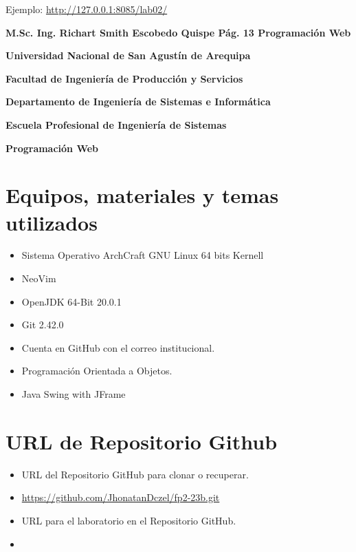Ejemplo: \url{http://127.0.0.1:8085/lab02/}

\textbf{M.Sc. Ing. Richart Smith Escobedo Quispe Pág. 13 Programación Web}

\textbf{Universidad Nacional de San Agustín de Arequipa}

\textbf{Facultad de Ingeniería de Producción y Servicios}

\textbf{Departamento de Ingeniería de Sistemas e Informática}

\textbf{Escuela Profesional de Ingeniería de Sistemas}

\textbf{Programación Web}
		
	\section{Equipos, materiales y temas utilizados}
	\begin{itemize}
		\item Sistema Operativo ArchCraft GNU Linux 64 bits Kernell
		\item NeoVim
		\item OpenJDK 64-Bit 20.0.1 
		\item Git 2.42.0
		\item Cuenta en GitHub con el correo institucional.
		\item Programación Orientada a Objetos.
    \item Java Swing with JFrame
	\end{itemize}
	\section{URL de Repositorio Github}
	\begin{itemize}
            \item URL del Repositorio GitHub para clonar o recuperar.
            \item \url{https://github.com/JhonatanDczel/fp2-23b.git}
            \item URL para el laboratorio \itemPracticeNumber{} en el Repositorio GitHub.
            \item \itemUrl
	\end{itemize}
